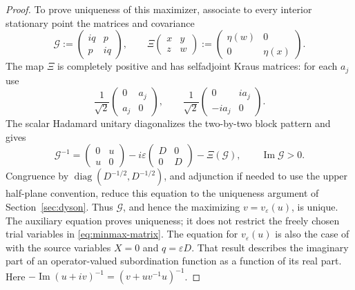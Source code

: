 \begin{proof}
To prove uniqueness of this maximizer, associate to every interior stationary point the matrices and covariance
\[
 \mathcal G:=\begin{pmatrix}iq&p\\p&iq\end{pmatrix},
 \qquad
 \Xi\begin{pmatrix}x&y\\z&w\end{pmatrix}
       :=\begin{pmatrix}\eta(w)&0\\0&\eta(x)\end{pmatrix}.
\]
The map $\Xi$ is completely positive and has selfadjoint Kraus matrices: for each $a_j$ use
\[
 \frac1{\sqrt2}\begin{pmatrix}0&a_j\\a_j&0\end{pmatrix},
 \qquad
 \frac1{\sqrt2}\begin{pmatrix}0&ia_j\\-ia_j&0\end{pmatrix}.
\]
The scalar Hadamard unitary diagonalizes the two-by-two block pattern and gives
\begin{equation}\label{eq:minmax-auxiliary-dyson}
 \mathcal G^{-1}
 =\begin{pmatrix}0&u\\u&0\end{pmatrix}
  -i\varepsilon\begin{pmatrix}D&0\\0&D\end{pmatrix}
  -\Xi(\mathcal G),\qquad \operatorname{Im}\mathcal G>0.
\end{equation}
Congruence by $\operatorname{diag}(D^{-1/2},D^{-1/2})$, and adjunction if needed to use the upper half-plane convention, reduce this equation to the uniqueness argument of Section~\ref{sec:dyson}.
Thus $\mathcal G$, and hence the maximizing $v=v_\varepsilon(u)$, is unique.
The auxiliary equation proves uniqueness; it does not restrict the freely chosen trial variables in \eqref{eq:minmax-matrix}.
The equation for $v_\varepsilon(u)$ is also the case of \cite[Proposition 3.1 and Remark 3.2]{Bel15} with the source variables $X=0$ and $q=\varepsilon D$.
That result describes the imaginary part of an operator-valued subordination function as a function of its real part.
Here $-\operatorname{Im}(u+iv)^{-1}=(v+uv^{-1}u)^{-1}$.


\end{proof}
